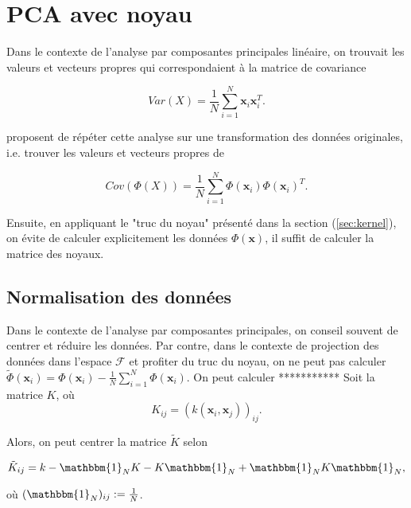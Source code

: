 \section{PCA avec noyau}

Dans le contexte de l'analyse par composantes principales linéaire, on trouvait les valeurs et vecteurs propres qui correspondaient à la matrice de covariance 

\begin{equation*}
Var(X) = \frac{1}{N} \sum_{i = 1}^N \textbf{x}_i \textbf{x}_i^T.
\end{equation*}

\cite{scholkopf1997kernel} proposent de répéter cette analyse sur une transformation des données originales, i.e. trouver les valeurs et vecteurs propres de

\begin{equation}\label{eq:covkernel}
Cov(\Phi(X)) = \frac{1}{N} \sum_{i = 1}^{N} \Phi(\textbf{x}_i)\Phi(\textbf{x}_i)^T.
\end{equation}

Ensuite, en appliquant le "truc du noyau" présenté dans la section (\ref{sec:kernel}), on évite de calculer explicitement les données $\Phi(\textbf{x})$, il suffit de calculer la matrice des noyaux.


\subsection{Normalisation des données}

Dans le contexte de l'analyse par composantes principales, on conseil souvent de centrer et réduire les données. Par contre, dans le contexte de projection des données dans l'espace $\mathcal{F}$ et profiter du truc du noyau, on ne peut pas calculer $\widetilde{\Phi}(\textbf{x}_i) = \Phi(\textbf{x}_i) - \frac{1}{N}\sum_{i = 1}^{N}\Phi(\textbf{x}_i)$. On peut calculer ***********
Soit la matrice $K$, où 
$$K_{ij} = (k(\textbf{x}_i, \textbf{x}_j))_{ij}.$$

Alors, on peut centrer la matrice $\tilde{K}$ selon

\begin{equation*}
\tilde{K}_{ij} = k - \mathbbm{1}_NK - K\mathbbm{1}_N + \mathbbm{1}_NK\mathbbm{1}_N,
\end{equation*}

où $(\mathbbm{1}_N)_{ij} := \frac{1}{N}$. 


